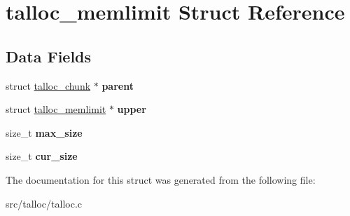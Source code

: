 \hypertarget{structtalloc__memlimit}{}\section{talloc\+\_\+memlimit Struct Reference}
\label{structtalloc__memlimit}
\subsection*{Data Fields}
\begin{DoxyCompactItemize}
\item 
\hypertarget{structtalloc__memlimit_adcce3545329d40f90193167e5fe26167}{}struct \hyperlink{structtalloc__chunk}{talloc\+\_\+chunk} $\ast$ {\bfseries parent}\label{structtalloc__memlimit_adcce3545329d40f90193167e5fe26167}

\item 
\hypertarget{structtalloc__memlimit_abca05e87de6962053b15f0bb6cabfb4e}{}struct \hyperlink{structtalloc__memlimit}{talloc\+\_\+memlimit} $\ast$ {\bfseries upper}\label{structtalloc__memlimit_abca05e87de6962053b15f0bb6cabfb4e}

\item 
\hypertarget{structtalloc__memlimit_ae539e200b099f5982ce74c4356f9b86f}{}size\+\_\+t {\bfseries max\+\_\+size}\label{structtalloc__memlimit_ae539e200b099f5982ce74c4356f9b86f}

\item 
\hypertarget{structtalloc__memlimit_a11634ce53e75286be1a502453c74fbe0}{}size\+\_\+t {\bfseries cur\+\_\+size}\label{structtalloc__memlimit_a11634ce53e75286be1a502453c74fbe0}

\end{DoxyCompactItemize}


The documentation for this struct was generated from the following file\+:\begin{DoxyCompactItemize}
\item 
src/talloc/talloc.\+c\end{DoxyCompactItemize}
